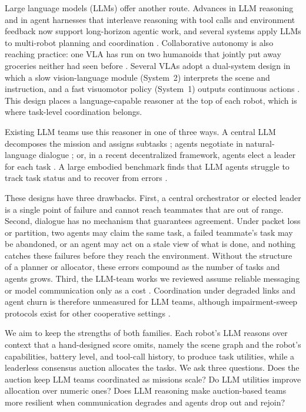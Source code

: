 \documentclass[letterpaper]{article}
\begin{document}
Large language models (LLMs) offer another route. Advances in LLM reasoning and in agent harnesses that interleave reasoning with tool calls and environment feedback \citep{yao2023react} now support long-horizon agentic work, and several systems apply LLMs to multi-robot planning and coordination \citep{mandi2024roco, kannan2024smartllm, chen2024scalable, zhang2024coela, liu2025coherent, zhang2025lammap, nayak2024llamar}. Collaborative autonomy is also reaching practice: one VLA has run on two humanoids that jointly put away groceries neither had seen before \citep{figure2025helix}. Several VLAs adopt a dual-system design in which a slow vision-language module (System~2) interprets the scene and instruction, and a fast visuomotor policy (System~1) outputs continuous actions \citep{nvidia2025gr00t, figure2025helix}. This design places a language-capable reasoner at the top of each robot, which is where task-level coordination belongs.

Existing LLM teams use this reasoner in one of three ways. A central LLM decomposes the mission and assigns subtasks \citep{kannan2024smartllm, liu2025coherent, zhang2025lammap}; agents negotiate in natural-language dialogue \citep{mandi2024roco, zhang2024coela, chen2024scalable}; or, in a recent decentralized framework, agents elect a leader for each task \citep{dynahmrc2026}. A large embodied benchmark finds that LLM agents struggle to track task status and to recover from errors \citep{chang2025partnr}.

These designs have three drawbacks. First, a central orchestrator or elected leader is a single point of failure and cannot reach teammates that are out of range. Second, dialogue has no mechanism that guarantees agreement. Under packet loss or partition, two agents may claim the same task, a failed teammate's task may be abandoned, or an agent may act on a stale view of what is done, and nothing catches these failures before they reach the environment. Without the structure of a planner or allocator, these errors compound as the number of tasks and agents grows. Third, the LLM-team works we reviewed assume reliable messaging or model communication only as a cost \citep{zhang2024coela}. Coordination under degraded links and agent churn is therefore unmeasured for LLM teams, although impairment-sweep protocols exist for other cooperative settings \citep{bansal2026agentcomm}.

We aim to keep the strengths of both families. Each robot's LLM reasons over context that a hand-designed score omits, namely the scene graph and the robot's capabilities, battery level, and tool-call history, to produce task utilities, while a leaderless consensus auction allocates the tasks. We ask three questions. Does the auction keep LLM teams coordinated as missions scale? Do LLM utilities improve allocation over numeric ones? Does LLM reasoning make auction-based teams more resilient when communication degrades and agents drop out and rejoin?
\end{document}
